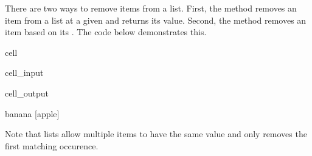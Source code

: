 \documentclass[letterpaper,10pt,english]{jupyterBook}
\begin{document}
\sphinxAtStartPar
There are two ways to remove items from a list. First, the  method removes an item from a list at a given  and returns its value. Second, the  method removes an item based on its . The code below demonstrates this.

\begin{sphinxuseclass}{cell}\begin{sphinxVerbatimInput}

\begin{sphinxuseclass}{cell_input}
\begin{sphinxVerbatim}[commandchars=\\\{\}]
  \PYG{p}{[}  \PYG{p}{]}
  
\end{sphinxVerbatim}

\end{sphinxuseclass}\end{sphinxVerbatimInput}
\begin{sphinxVerbatimOutput}

\begin{sphinxuseclass}{cell_output}
\begin{sphinxVerbatim}
banana
[\PYGZsq{}apple\PYGZsq{}]
\end{sphinxVerbatim}

\end{sphinxuseclass}\end{sphinxVerbatimOutput}

\end{sphinxuseclass}
\sphinxAtStartPar
Note that lists allow multiple items to have the same value and  only removes the first matching occurence.
\end{document}
